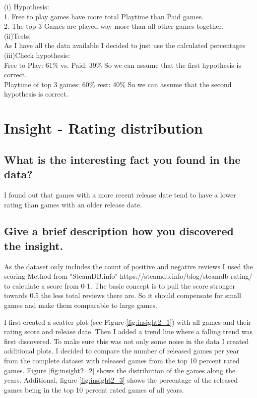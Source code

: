 \documentclass[11pt]{article}
\begin{document}
(i) Hypothesis:\\
1. Free to play games have more total Playtime than Paid games.\\
2. The top 3 Games are played way more than all other games together.\\
(ii)Tests:\\
As I have all the data available I decided to just use the calculated percentages\\
(iii)Check hypothesis:\\
Free to Play: 61\% vs. Paid: 39\% So we can assume that the first hypothesis is correct.\\
Playtime of top 3 games:  60\% rest: 40\% So we can assume that the second hypothesis is correct.\\

\section{Insight - Rating distribution}

\subsection{What is the interesting fact you found in the data?}

I found out that games with a more recent release date tend to have a lower rating than games with an older release date.\\

\subsection{Give a brief description how you discovered the
insight.}

As the dataset only includes the count of positive and negative reviews I used the scoring Method from "SteamDB.info" https://steamdb.info/blog/steamdb-rating/ to calculate a score from 0-1. The basic concept is to pull the score stronger towards 0.5 the less total reviews there are. So it should compensate for small  games and make them comparable to large games. 

I first created a scatter plot (see Figure \ref{fig:insight2_1}) with all games and their rating score and release date. Then I added a trend line where a falling trend was first discovered. To make sure this was not only some noise in the data I created additional plots. I decided to compare the number of released games per year from the complete dataset with released games from the top 10 percent rated games. Figure \ref{fig:insight2_2} shows the distribution of the games along the years. Additional, figure \ref{fig:insight2_3} shows the percentage of the released games being in the top 10 percent rated games of all years.  
\end{document}
